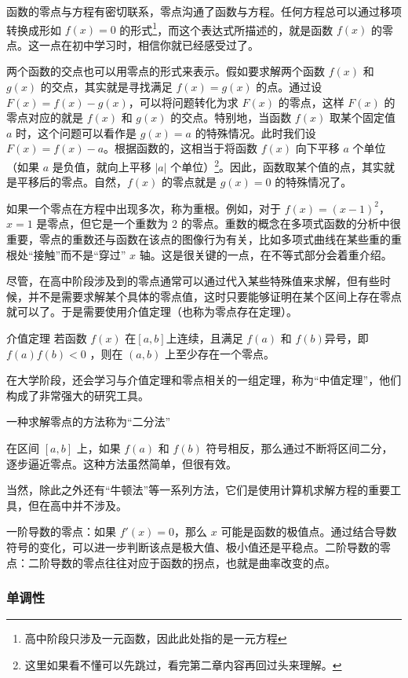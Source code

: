 函数的零点与方程有密切联系，零点沟通了函数与方程。任何方程总可以通过移项转换成形如 $f(x) = 0$ 的形式\footnote{高中阶段只涉及一元函数，因此此处指的是一元方程}，而这个表达式所描述的，就是函数 $f(x)$ 的零点。这一点在初中学习时，相信你就已经感受过了。

两个函数的交点也可以用零点的形式来表示。假如要求解两个函数 $f(x)$ 和 $g(x)$ 的交点，其实就是寻找满足 $f(x) = g(x)$ 的点。通过设 $F(x) = f(x) - g(x)$，可以将问题转化为求 $F(x)$ 的零点，这样 $F(x)$ 的零点对应的就是 $f(x)$ 和 $g(x)$ 的交点。特别地，当函数 $f(x)$ 取某个固定值 $a$ 时，这个问题可以看作是 $g(x) = a$ 的特殊情况。此时我们设 $F(x) = f(x) - a$。根据函数的，这相当于将函数 $f(x)$ 向下平移 $a$ 个单位（如果 $a$ 是负值，就向上平移 $|a|$ 个单位）\footnote{这里如果看不懂可以先跳过，看完第二章内容再回过头来理解。}。因此，函数取某个值的点，其实就是平移后的零点。自然，$f(x)$ 的零点就是 $g(x) = 0$ 的特殊情况了。

如果一个零点在方程中出现多次，称为重根。例如，对于 $f(x) = (x - 1)^2$，$x = 1$ 是零点，但它是一个重数为 2 的零点。重数的概念在多项式函数的分析中很重要，零点的重数还与函数在该点的图像行为有关，比如多项式曲线在某些重的重根处“接触”而不是“穿过” $x$ 轴。这是很关键的一点，在不等式部分会着重介绍。

尽管，在高中阶段涉及到的零点通常可以通过代入某些特殊值来求解，但有些时候，并不是需要求解某个具体的零点值，这时只要能够证明在某个区间上存在零点就可以了。于是需要使用介值定理（也称为零点存在定理）。

\begin{definition}{介值定理}
若函数 $f(x)$ 在$[a,b]$上连续，且满足 $f(a)$ 和 $f(b)$异号，即$f(a)f(b)<0$ ，则在 $(a, b)$ 上至少存在一个零点。
\end{definition}

在大学阶段，还会学习与介值定理和零点相关的一组定理，称为“中值定理”，他们构成了非常强大的研究工具。

一种求解零点的方法称为“二分法”

在区间 $[a, b]$ 上，如果 $f(a)$ 和 $f(b)$ 符号相反，那么通过不断将区间二分，逐步逼近零点。这种方法虽然简单，但很有效。

当然，除此之外还有“牛顿法”等一系列方法，它们是使用计算机求解方程的重要工具，但在高中并不涉及。


一阶导数的零点：如果 $f'(x) = 0$，那么 $x$ 可能是函数的极值点。通过结合导数符号的变化，可以进一步判断该点是极大值、极小值还是平稳点。二阶导数的零点：二阶导数的零点往往对应于函数的拐点，也就是曲率改变的点。

\subsubsection{单调性}



